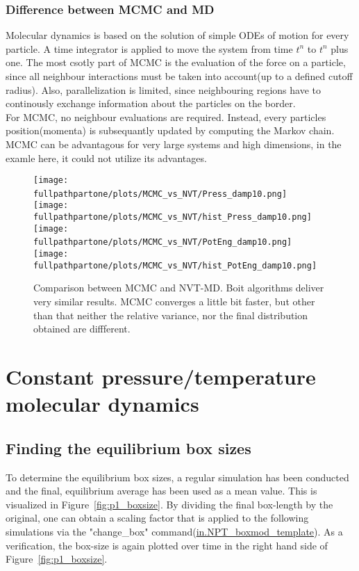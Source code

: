 \documentclass[10pt,a4paper]{report}
\def \pathpartone {../../1_three-dimensional_atomic_system}
\def \fullpathpartone {/home/lukas/Desktop/project/independence/atomistic_modeling/exam/1_three-dimensional_atomic_system}
\begin{document}
\subsubsection{Difference between MCMC and MD}
Molecular dynamics is based on the solution of simple ODEs of motion for every particle. A time integrator is applied to move the system from time $t^n$ to $t^n$ plus one. The most csotly part of MCMC is the evaluation of the force on a particle, since all neighbour interactions must be taken into account(up to a defined cutoff radius). Also, parallelization is limited, since neighbouring regions have to continously exchange information about the particles on the border.\\
For MCMC, no neighbour evaluations are required. Instead, every particles position(momenta) is subsequantly updated by computing the Markov chain. MCMC can be advantagous for very large systems and high dimensions, in the examle here, it could not utilize its advantages.


\begin{center}
\begin{figure}[h]
\texttt{[image: \\fullpathpartone/plots/MCMC\_vs\_NVT/Press\_damp10.png]}~
\texttt{[image: \\fullpathpartone/plots/MCMC\_vs\_NVT/hist\_Press\_damp10.png]}
\texttt{[image: \\fullpathpartone/plots/MCMC\_vs\_NVT/PotEng\_damp10.png]}~
\texttt{[image: \\fullpathpartone/plots/MCMC\_vs\_NVT/hist\_PotEng\_damp10.png]}
\caption[aaa]{Comparison between MCMC and NVT-MD. Boit algorithms deliver very similar results. MCMC converges a little bit faster, but other than that neither the relative variance, nor the final distribution obtained are diffferent.}
\label{fig:p1_MCMC_vs_NVT}
\end{figure}
\end{center}








\section{Constant pressure/temperature molecular dynamics}
\subsection{Finding the equilibrium box sizes}
To determine the equilibrium box sizes, a regular simulation has been conducted and the final, equilibrium average has been used as a mean value. This is visualized in Figure~\ref{fig:p1_boxsize}. By dividing the final box-length by the original, one can obtain a scaling factor that is applied to the following simulations via the "change\_box" command(\href{\pathpartone/in.NPT_boxmod_template}{in.NPT\_boxmod\_template}).
As a verification, the box-size is again plotted over time in the right hand side of Figure~\ref{fig:p1_boxsize}.\\
\end{document}
